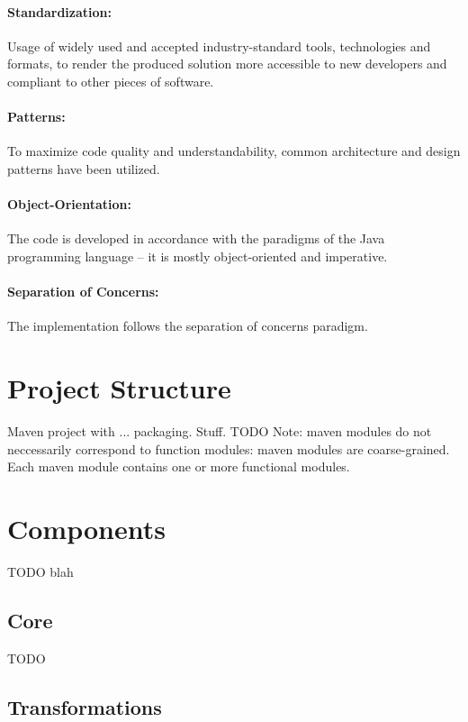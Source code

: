 \paragraph{Standardization:} Usage of widely used and accepted industry-standard tools, technologies and formats, to render the produced solution more accessible to new developers and compliant to other pieces of software.

\paragraph{Patterns:} To maximize code quality and understandability, common architecture and design patterns have been utilized.

\paragraph{Object-Orientation:} The code is developed in accordance with the paradigms of the Java programming language -- it is mostly object-oriented and imperative.

\paragraph{Separation of Concerns:} The implementation follows the separation of concerns paradigm.

\section{Project Structure}
\label{sec:impl:structure}

Maven project with ... packaging. Stuff. TODO Note: maven modules do not neccessarily correspond to function modules: maven modules are coarse-grained. Each maven module contains one or more functional modules.

\section{Components}
\label{sec:impl:components}
 
TODO blah

\subsection{Core}

TODO

\subsection{Transformations}

